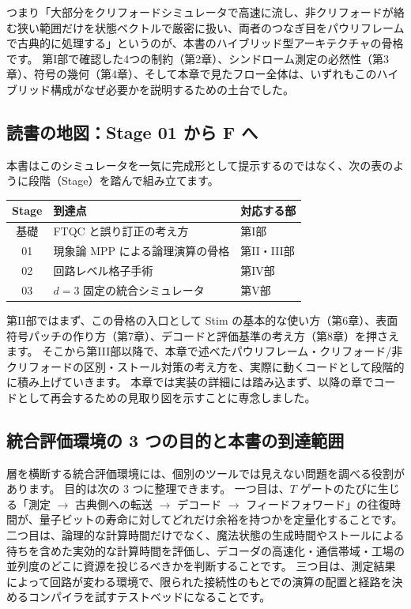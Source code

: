 つまり「大部分をクリフォードシミュレータで高速に流し、非クリフォードが絡む狭い範囲だけを状態ベクトルで厳密に扱い、両者のつなぎ目をパウリフレームで古典的に処理する」というのが、本書のハイブリッド型アーキテクチャの骨格です。
第I部で確認した4つの制約（第2章）、シンドローム測定の必然性（第3章）、符号の幾何（第4章）、そして本章で見たフロー全体は、いずれもこのハイブリッド構成がなぜ必要かを説明するための土台でした。

\subsection{読書の地図：Stage 01 から F へ}

本書はこのシミュレータを一気に完成形として提示するのではなく、次の表のように段階（Stage）を踏んで組み立てます。

\begin{center}
\begin{tabular}{cll}
\hline
Stage & 到達点 & 対応する部 \\
\hline
基礎 & FTQC と誤り訂正の考え方 & 第I部 \\
01 & 現象論 MPP による論理演算の骨格 & 第II・III部 \\
02 & 回路レベル格子手術 & 第IV部 \\
03 & $d=3$ 固定の統合シミュレータ & 第V部 \\
\hline
\end{tabular}
\end{center}

第II部ではまず、この骨格の入口として Stim の基本的な使い方（第6章）、表面符号パッチの作り方（第7章）、デコードと評価基準の考え方（第8章）を押さえます。
そこから第III部以降で、本章で述べたパウリフレーム・クリフォード/非クリフォードの区別・ストール対策の考え方を、実際に動くコードとして段階的に積み上げていきます。
本章では実装の詳細には踏み込まず、以降の章でコードとして再会するための見取り図を示すことに専念しました。

\subsection{統合評価環境の 3 つの目的と本書の到達範囲}\label{sec:integrated_goals}

層を横断する統合評価環境には、個別のツールでは見えない問題を調べる役割があります。
目的は次の 3 つに整理できます。
一つ目は、$T$ ゲートのたびに生じる「測定 $\to$ 古典側への転送 $\to$ デコード $\to$ フィードフォワード」の往復時間が、量子ビットの寿命に対してどれだけ余裕を持つかを定量化することです。
二つ目は、論理的な計算時間だけでなく、魔法状態の生成時間やストールによる待ちを含めた実効的な計算時間を評価し、デコーダの高速化・通信帯域・工場の並列度のどこに資源を投じるべきかを判断することです。
三つ目は、測定結果によって回路が変わる環境で、限られた接続性のもとでの演算の配置と経路を決めるコンパイラを試すテストベッドになることです。


